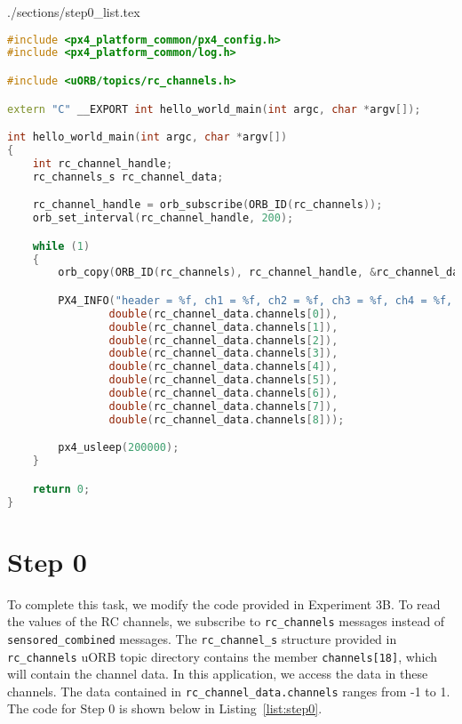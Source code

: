 \begin{filecontents}[overwrite]{./sections/step0_list.tex}
\begin{lstlisting}[language=c++,caption=Step 0 Code, label=list:step0]
#include <px4_platform_common/px4_config.h>
#include <px4_platform_common/log.h>

#include <uORB/topics/rc_channels.h>

extern "C" __EXPORT int hello_world_main(int argc, char *argv[]);

int hello_world_main(int argc, char *argv[])
{
    int rc_channel_handle;
    rc_channels_s rc_channel_data;

    rc_channel_handle = orb_subscribe(ORB_ID(rc_channels));
    orb_set_interval(rc_channel_handle, 200);

    while (1)
    {
        orb_copy(ORB_ID(rc_channels), rc_channel_handle, &rc_channel_data);

        PX4_INFO("header = %f, ch1 = %f, ch2 = %f, ch3 = %f, ch4 = %f, ch5 = %f, ch6 = %f, ch7 = %f, ch8 = %f",
                double(rc_channel_data.channels[0]),
                double(rc_channel_data.channels[1]),
                double(rc_channel_data.channels[2]),
                double(rc_channel_data.channels[3]),
                double(rc_channel_data.channels[4]),
                double(rc_channel_data.channels[5]),
                double(rc_channel_data.channels[6]),
                double(rc_channel_data.channels[7]),
                double(rc_channel_data.channels[8]));

        px4_usleep(200000);
    }

    return 0;
}
\end{lstlisting}
\end{filecontents}

\section*{Step 0}

To complete this task, we modify the code provided in Experiment 3B. To read the values of the RC channels, we subscribe to \texttt{rc\_channels} messages instead of \texttt{sensored\_combined} messages. The \texttt{rc\_channel\_s} structure provided in \texttt{rc\_channels} uORB topic directory contains the member \texttt{channels[18]}, which will contain the channel data. In this application, we access the data in these channels. The data contained in \texttt{rc\_channel\_data.channels} ranges from -1 to 1. The code for Step 0 is shown below in Listing~\ref{list:step0}.


